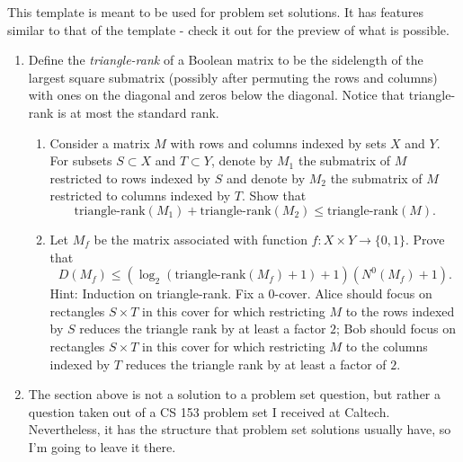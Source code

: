 \documentclass{article}
\begin{document}


This template is meant to be used for problem set solutions. It has features
similar to that of the  template - check it out for the
preview of what is possible.

\begin{enumerate}
    \item Define the {\em triangle-rank} of a Boolean matrix to be the
      sidelength of the largest square submatrix (possibly after permuting
      the rows and columns) with ones on the diagonal
      and zeros below the diagonal. Notice that triangle-rank is at
      most the standard rank.  
    \begin{enumerate}
        \item Consider a matrix $M$ with rows and columns indexed by sets $X$
          and $Y$. For subsets $S \subset X$ and $T \subset Y$, denote by
          $M_1$ the submatrix of $M$ restricted to rows indexed by $S$ and
          denote by $M_2$ the submatrix of $M$ restricted to columns indexed
          by $T$. Show that \[\mbox{triangle-rank}(M_1) +
          \mbox{triangle-rank}(M_2) \le \mbox{triangle-rank}(M).\]
        \item Let $M_f$ be the matrix associated with function $f:X \times Y
          \rightarrow \{0,1\}$. Prove that 
        \[D(M_f) \le (\log_2(\mbox{triangle-rank}(M_f)+1) + 1)(N^0(M_f) + 1).\]
        Hint: Induction on triangle-rank. Fix a $0$-cover. Alice should focus
        on rectangles $S \times T$ in this cover for which restricting $M$ to
        the rows indexed by $S$ reduces the triangle rank by at least a factor
        $2$; Bob should focus on rectangles $S \times T$ in this cover for
        which restricting $M$ to the columns indexed by $T$ reduces the
        triangle rank by at least a factor of $2$. 
    \end{enumerate}

    \item The section above is not a solution to a problem set question, but
        rather a question taken out of a CS 153 problem set I received at
        Caltech.  Nevertheless, it has the structure that problem set solutions
        usually have, so I'm going to leave it there.
\end{enumerate}

\end{document}
